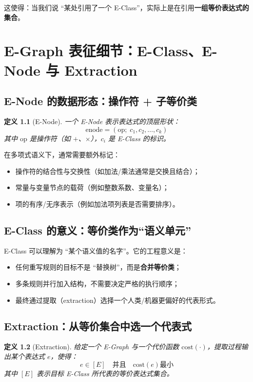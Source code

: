 \documentclass[12pt,openany]{book}
\newtheorem{definition}{定义}[chapter]
\begin{document}
这使得：当我们说 ``某处引用了一个 E-Class''，实际上是在引用\textbf{一组等价表达式的集合}。

\chapter{E-Graph 表征细节：E-Class、E-Node 与 Extraction}

\section{E-Node 的数据形态：操作符 + 子等价类}

\begin{definition}[E-Node]
一个 E-Node 表示表达式的顶层形状：
\[
\text{enode} = (\mathrm{op};\; c_1, c_2, \ldots, c_k)
\]
其中 $\mathrm{op}$ 是操作符（如 $+$、$\times$），$c_i$ 是 E-Class 的标识。
\end{definition}

在多项式语义下，通常需要额外标记：

\begin{itemize}
  \item 操作符的结合性与交换性（如加法/乘法通常是交换且结合）；
  \item 常量与变量节点的载荷（例如整数系数、变量名）；
  \item 项的有序/无序表示（例如加法项列表是否需要排序）。
\end{itemize}

\section{E-Class 的意义：等价类作为“语义单元”}

E-Class 可以理解为 ``某个语义值的名字''。它的工程意义是：

\begin{itemize}
  \item 任何重写规则的目标不是 ``替换树''，而是\textbf{合并等价类}；
  \item 多条规则并行加入结构，不需要决定严格的执行顺序；
  \item 最终通过提取（extraction）选择一个人类/机器更偏好的代表形式。
\end{itemize}

\section{Extraction：从等价集合中选一个代表式}

\begin{definition}[Extraction]
给定一个 E-Graph 与一个代价函数 $\mathrm{cost}(\cdot)$，提取过程输出某个表达式 $e$，使得：
\[
  e \in [E] \quad \text{并且} \quad \mathrm{cost}(e) \text{最小}
\]
其中 $[E]$ 表示目标 E-Class 所代表的等价表达式集合。
\end{definition}
\end{document}
